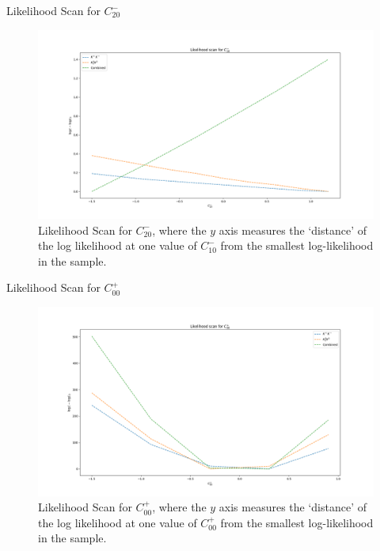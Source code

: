 \begin{frame}{Likelihood Scan for $C_{20}^{-}$}
\begin{figure}
    \centering
        \includegraphics[width=\textwidth]{2020_04_23/figs/M20_Norm.png}
    \caption{Likelihood Scan for $C_{20}^{-}$, where the $y$ axis measures the `distance' of the log likelihood at one value of $C_{10}^{-}$ from the smallest log-likelihood in the sample.}
    \label{fig:scanCM20}
\end{figure}
\end{frame}





\begin{frame}{Likelihood Scan for $C_{00}^{+}$}
\begin{figure}
    \centering
        \includegraphics[width=\textwidth]{2020_04_23/figs/P00_Norm.png}
    \caption{Likelihood Scan for $C_{00}^{+}$, where the $y$ axis measures the `distance' of the log likelihood at one value of $C_{00}^{+}$ from the smallest log-likelihood in the sample.}
    \label{fig:scanCP01}
\end{figure}
\end{frame}

